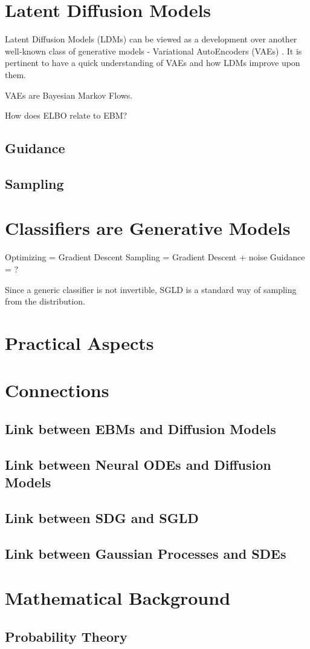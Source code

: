 \documentclass[a4paper, 11pt]{article}
\begin{document}
\section{Latent Diffusion Models}

Latent Diffusion Models (LDMs) can be viewed as a development over another well-known class of generative models - Variational AutoEncoders (VAEs) \cite{dieleman2023perspectives}. It is pertinent to have a quick understanding of VAEs and how LDMs improve upon them.

VAEs are Bayesian Markov Flows.

How does ELBO relate to EBM? 



\subsection{Guidance}

\subsection{Sampling}


\section{Classifiers are Generative Models}

Optimizing = Gradient Descent
Sampling = Gradient Descent + noise
Guidance = ?

Since a generic classifier is not invertible, SGLD is a standard way of sampling from the distribution.

\section{Practical Aspects}

\section{Connections}
\subsection{Link between EBMs and Diffusion Models}
\subsection{Link between Neural ODEs and Diffusion Models}
\subsection{Link between SDG and SGLD}
\subsection{Link between Gaussian Processes and SDEs}

\appendix
\section{Mathematical Background}
\subsection{Probability Theory}


 

\end{document}
